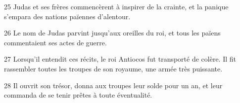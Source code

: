 25 Judas et ses frères commencèrent à inspirer de la crainte, et la panique s’empara des nations païennes d’alentour.

26 Le nom de Judas parvint jusqu’aux oreilles du roi, et tous les païens commentaient ses actes de guerre.

27 Lorsqu’il entendit ces récits, le roi Antiocos fut transporté de colère. Il fit rassembler toutes les troupes de son royaume, une armée très puissante.

28 Il ouvrit son trésor, donna aux troupes leur solde pour un an, et leur commanda de se tenir prêtes à toute éventualité.